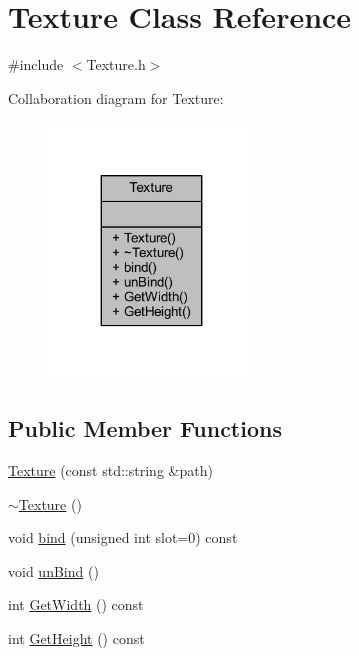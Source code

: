 \hypertarget{class_texture}{}\section{Texture Class Reference}
\label{class_texture}


{\ttfamily \#include $<$Texture.\+h$>$}



Collaboration diagram for Texture\+:
\nopagebreak
\begin{figure}[H]
\begin{center}
\leavevmode
\includegraphics[width=155pt]{class_texture__coll__graph}
\end{center}
\end{figure}
\subsection*{Public Member Functions}
\begin{DoxyCompactItemize}
\item 
\mbox{\hyperlink{class_texture_a4cd45e8898c02b5a5c790a479233124b}{Texture}} (const std\+::string \&path)
\item 
\mbox{\hyperlink{class_texture_a09c4bcb7462f64c1d20fa69dba3cee8a}{$\sim$\+Texture}} ()
\item 
void \mbox{\hyperlink{class_texture_a71ec7e2582cc0005fa47f78087d4a539}{bind}} (unsigned int slot=0) const
\item 
void \mbox{\hyperlink{class_texture_a59f83c1891b109e49b42a330b66eba16}{un\+Bind}} ()
\item 
int \mbox{\hyperlink{class_texture_a7f5ee18c7466f904fa371bd97399a944}{Get\+Width}} () const
\item 
int \mbox{\hyperlink{class_texture_a289701837e23c9272509f377524ee8f2}{Get\+Height}} () const
\end{DoxyCompactItemize}



